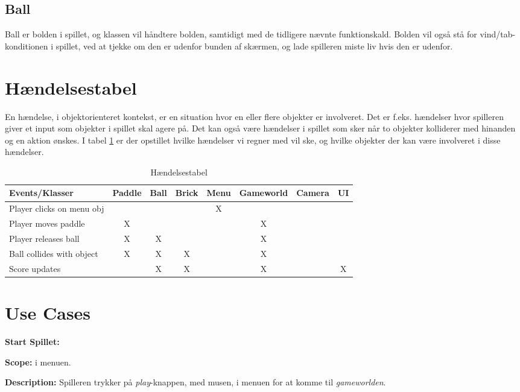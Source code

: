 \subsection{Ball}
Ball er bolden i spillet, og klassen vil håndtere bolden, samtidigt med de tidligere nævnte funktionskald. Bolden vil også stå for vind/tab-konditionen i spillet, ved at tjekke om den er udenfor bunden af skærmen, og lade spilleren miste liv hvis den er udenfor.


\section{Hændelsestabel}
En hændelse, i objektorienteret kontekst, er en situation hvor en eller flere objekter er involveret. Det er f.eks. hændelser hvor spilleren giver et input som objekter i spillet skal agere på. Det kan også være hændelser i spillet som sker når to objekter kolliderer med hinanden og en aktion ønskes. I tabel \ref{eventtabel} er der opstillet hvilke hændelser vi regner med vil ske, og hvilke objekter der kan være involveret i disse hændelser.
\begin{table}[]
\centering
\caption{Hændelsestabel}
\label{eventtabel}
\begin{tabular}{|l|c|c|c|c|c|c|c|}
\hline
Events/Klasser & Paddle & Ball & Brick & Menu & Gameworld & Camera & UI \\ \hline
Player clicks on menu obj &  &  &  & X &  &  &  \\ \hline
Player moves paddle & X &  &  &  & X &  &  \\ \hline
Player releases ball & X & X &  &  & X &  &  \\ \hline
Ball collides with object & X & X & X &  & X &  &  \\ \hline
Score updates &  & X & X &  & X &  & X \\ \hline
\end{tabular}
\end{table}

\section{Use Cases}

\textbf{Start Spillet:}\newline

\textbf{Scope:}\newline
i menuen.\newline

\textbf{Description:} \newline
Spilleren trykker på \textit{play}-knappen, med musen, i menuen for at komme til \textit{gameworlden}. \newline

